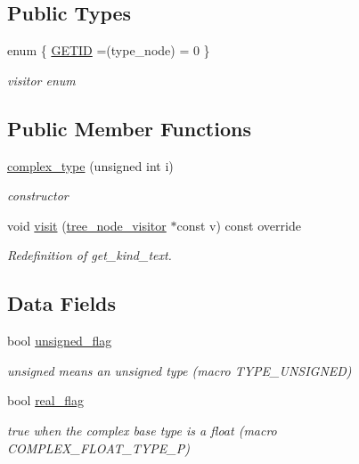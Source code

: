 \subsection*{Public Types}
\begin{DoxyCompactItemize}
\item 
enum \{ \hyperlink{structcomplex__type_ac3b732d0d04733e716d966b9a2cb7d85a75dfdddc1ccf4e24be1dc6577f8e73be}{G\+E\+T\+ID} =(type\+\_\+node) = 0
 \}\begin{DoxyCompactList}\small\item\em visitor enum \end{DoxyCompactList}
\end{DoxyCompactItemize}
\subsection*{Public Member Functions}
\begin{DoxyCompactItemize}
\item 
\hyperlink{structcomplex__type_a85d5884d2d5ff6d5e18a97fbbe69f4d2}{complex\+\_\+type} (unsigned int i)
\begin{DoxyCompactList}\small\item\em constructor \end{DoxyCompactList}\item 
void \hyperlink{structcomplex__type_a22e4557b10d89aad537a1d213bf5eafd}{visit} (\hyperlink{classtree__node__visitor}{tree\+\_\+node\+\_\+visitor} $\ast$const v) const override
\begin{DoxyCompactList}\small\item\em Redefinition of get\+\_\+kind\+\_\+text. \end{DoxyCompactList}\end{DoxyCompactItemize}
\subsection*{Data Fields}
\begin{DoxyCompactItemize}
\item 
bool \hyperlink{structcomplex__type_abbbe2c5acf95c1c11bcba1de6941a1d1}{unsigned\+\_\+flag}
\begin{DoxyCompactList}\small\item\em unsigned means an unsigned type (macro T\+Y\+P\+E\+\_\+\+U\+N\+S\+I\+G\+N\+ED) \end{DoxyCompactList}\item 
bool \hyperlink{structcomplex__type_a1c4d62bd1a77d167c39a89382d15f5ac}{real\+\_\+flag}
\begin{DoxyCompactList}\small\item\em true when the complex base type is a float (macro C\+O\+M\+P\+L\+E\+X\+\_\+\+F\+L\+O\+A\+T\+\_\+\+T\+Y\+P\+E\+\_\+P) \end{DoxyCompactList}\end{DoxyCompactItemize}
